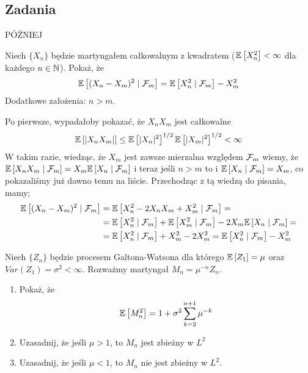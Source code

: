 \subsection{Zadania}

\setcounter{problem}{0}

\begin{problem}
  PÓŹNIEJ
\end{problem}

\begin{problem}
  Niech $\{X_n\}$ będzie martyngałem całkowalnym z kwadratem ($\expected{X_n^2}<\infty$ dla każdego $n\in\operatorname{\mathbb{N}}$). Pokaż, że
  $$\expected{(X_n-X_m)^2}{\set{F}_m}=\expected{X_n^2}{\set{F}_m}-X_m^2$$
  {\color{red}Dodatkowe założenia: $n>m$.}
\end{problem}

\begin{solution}
  Po pierwsze, wypadałoby pokazać, że $X_nX_m$ jest całkowalne
  $$\expected{|X_nX_m|}\leq\expected{|X_n|^2}^{1/2}\expected{|X_m|^2}^{1/2}<\infty$$
  W takim razie, wiedząc, że $X_m$ jest zawsze mierzalna względem $\mathcal{F}_m$ wiemy, że $\expected{X_nX_m}{\set{F}_m}=X_m\expected{X_n}{\set{F}_m}$ i teraz jeśli $n>m$ to i $\expected{X_n}{\set{F}_m}=X_m$, co pokazaliśmy już dawno temu na liście. Przechodząc z tą wiedzą do pisania, mamy;
  \begin{align*}
    \expected{(X_n-X_m)^2}{\set{F}_m}&=\expected{X_n^2-2X_nX_m+X_m^2}{\set{F}_m}=\\ 
                                     &=\expected{X_n^2}{\set{F}_m}+\expected{X_m^2}{\set{F}_m}-2X_m\expected{X_n}{\set{F}_m}=\\ 
                                     &=\expected{X_n^2}{\set{F}_m}+X_m^2-2X_m^2=\expected{X_n^2}{\set{F}_m}-X_m^2
  \end{align*}
\end{solution}

\begin{problem}
  Niech $\{Z_n\}$ będzie procesem Galtona-Watsona dla którego $\expected{Z_1}=\mu$ oraz $Var(Z_1)=\sigma^2<\infty$. Rozważmy martyngał $M_n=\mu^{-n}Z_n$.
  \begin{enumerate}[label=(\alph*)]
    \item Pokaż, że
      $$\expected{M_n^2}=1+\sigma^2\sum_{k=2}^{n+1}\mu^{-k}$$
    \item Uzasadnij, że jeśli $\mu>1$, to $M_n$ jest zbieżny w $L^2$
    \item Uzasadnij, że jeśli $\mu<1$, to $M_n$ nie jest zbieżny w $L^2$.
  \end{enumerate}
\end{problem}

